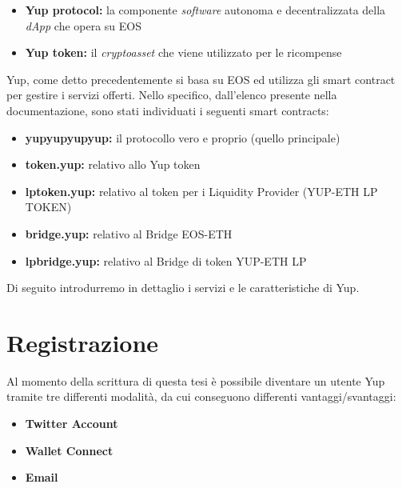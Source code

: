 \begin{itemize}
    \item \textbf{Yup protocol:} la componente \textit{software} autonoma e decentralizzata della \textit{dApp} che opera su EOS
    \item \textbf{Yup token:} il \textit{cryptoasset} che viene utilizzato per le ricompense
\end{itemize}

Yup, come detto precedentemente si basa su EOS ed utilizza gli smart contract per gestire i servizi offerti. Nello specifico, dall'elenco presente nella documentazione, sono stati individuati i seguenti smart contracts:

\begin{itemize}
    \item \textbf{yupyupyupyup:} il protocollo vero e proprio (quello principale)
    \item \textbf{token.yup:} relativo allo Yup token
    \item \textbf{lptoken.yup:} relativo al token per i Liquidity Provider (YUP-ETH LP TOKEN)
    \item \textbf{bridge.yup:} relativo al Bridge EOS-ETH
    \item \textbf{lpbridge.yup:} relativo al Bridge di token YUP-ETH LP
\end{itemize}

Di seguito introdurremo in dettaglio i servizi e le caratteristiche di Yup.

\section{Registrazione}
Al momento della scrittura di questa tesi è possibile diventare un utente Yup tramite tre differenti modalità, da cui conseguono differenti vantaggi/svantaggi:

\begin{itemize}
    \item \textbf{Twitter Account}
    \item \textbf{Wallet Connect}
    \item \textbf{Email}
\end{itemize}

